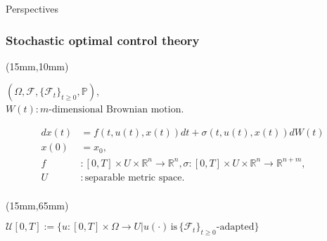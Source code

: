\begin{frame}[plain]
	\begin{center}
		{\LARGE Perspectives}
	\end{center}
\end{frame}
\begin{frame}[plain]
	\frametitle{Stochastic optimal control theory}
	\begin{textblock*}{100mm}(15mm,10mm)
		\begin{graybox}{}
			$(\Omega,\mathscr{F},\{\mathscr{F}_t\}_{t\geq 0},\mathbb{P})$,\\ $W(t):m\text{-dimensional Brownian motion}$.
			
			\begin{align*}
				dx(t)&=
				f(t,u(t),x(t))dt+\sigma(t,u(t),x(t))dW(t)\\
				x(0)&=
				x_0,\\
				f&:
				[0,T]\times U\times\mathbb{R}^n\rightarrow\mathbb{R}^n, \sigma:[0,T]\times U\times\mathbb{R}^n\rightarrow\mathbb{R}^{n+m},\\
				U&:
				\text{separable metric space}.\\
			\end{align*}
		\end{graybox}
	\end{textblock*}

	\begin{textblock*}{100mm}(15mm,65mm)
		\begin{yellowbox}{}
			$\mathcal{U}[0,T]:=\{u:[0,T]\times\Omega\rightarrow U | u(\cdot)\,\text{is}\,\{\mathscr{F}_t\}_{t\geq 0}\text{-adapted}\}$
		\end{yellowbox}
	\end{textblock*}
\end{frame}
